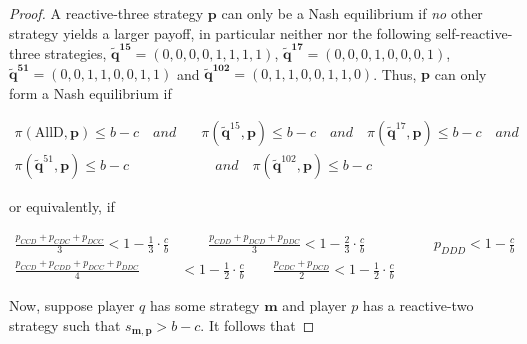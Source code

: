 \documentclass{article}
\theoremstyle{definition}
\begin{document}
\begin{proof}
A reactive-three strategy \(\mathbf{p}\) can only
be a Nash equilibrium if {\it no} other strategy yields a larger payoff, in
particular neither  nor the following self-reactive-three strategies,
$\mathbf{\tilde{q}^{15}} = (0, 0, 0, 0, 1, 1, 1, 1)$, $\mathbf{\tilde{q}^{17}} = (0, 0, 0, 1, 0, 0, 0, 1)$,
$\mathbf{\tilde{q}^{51}} = (0, 0, 1, 1, 0, 0, 1, 1)$ and
 $\mathbf{\tilde{q}^{102}} = (0, 1, 1, 0, 0, 1, 1, 0)$. Thus,
\(\mathbf{p}\) can only form a Nash equilibrium if 

\begin{align*}
\pi(\text{AllD}, \mathbf{p}) \leq b\!-\!c \quad { and } \quad & \pi(\mathbf{\tilde{q}}^{15}, \mathbf{p}) \leq b\!-\!c \quad { and } \quad \pi(\mathbf{\tilde{q}}^{17}, \mathbf{p}) \leq b\!-\!c \quad { and } \\[1em]
\pi(\mathbf{\tilde{q}}^{51}, \mathbf{p}) \leq b\!-\!c & \quad { and } \quad \pi(\mathbf{\tilde{q}}^{102}, \mathbf{p}) \leq b\!-\!c
\end{align*}

or equivalently, if

\begin{align}\label{Eq:NashConditionDonationGameN3}
    \frac{p_{CCD} + p_{CDC} + p_{DCC}}{3} < 1\!-\! \frac{1}{3} \cdot \frac{c}{b} & \qquad 
    \frac{p_{CDD} + p_{DCD} + p_{DDC}}{3} < 1\!-\! \frac{2}{3} \cdot \frac{c}{b} & \qquad 
    p_{DDD} < 1\!-\! \frac{c}{b} \\
    \frac{p_{CCD} + p_{CDD} + p_{DCC} + p_{DDC}}{4}  & < 1\!-\! \frac{1}{2} \cdot \frac{c}{b} 
    \qquad \frac{p_{CDC} + p_{DCD}}{2} < 1\!-\! \frac{1}{2} \cdot \frac{c}{b}
\end{align}

Now, suppose player $q$ has some strategy $\mathbf{m}$ and player $p$ has a reactive-two
strategy such that $s_{\mathbf{m}, \mathbf{p}} > b\!-\!c$. It follows that


\end{proof}
\end{document}
